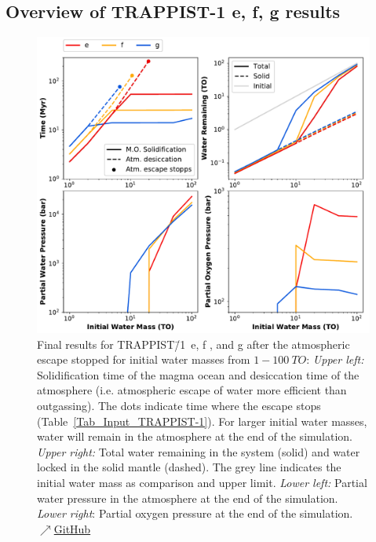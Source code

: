 \documentclass[paper=letterpaper,fontsize=12pt,oneside,twocolumn]{article}
\begin{document}
\subsection{Overview of TRAPPIST-1 e, f, g results}
\begin{figure}[p]
    \centering
    \includegraphics[width=\textwidth]{BarthFig8.pdf}
    \caption{Final results for TRAPPIST\=/1~e, f , and g after the atmospheric escape stopped for initial water masses from $1 - \SI{100}{TO}$: \textit{Upper left:} Solidification time of the magma ocean and desiccation time of the atmosphere (i.e. atmospheric escape of water more efficient than outgassing). The dots indicate time where the escape stops (Table~\ref{Tab_Input_TRAPPIST-1}). For larger initial water masses, water will remain in the atmosphere at the end of the simulation. \textit{Upper right:} Total water remaining in the system (solid) and water locked in the solid mantle (dashed). The grey line indicates the initial water mass as comparison and upper limit. \textit{Lower left:} Partial water pressure in the atmosphere at the end of the simulation. \textit{Lower right}: Partial oxygen pressure at the end of the simulation.
    \href{https://github.com/pbfeu/Trappist1_MagmOc/tree/public/Fig_Trappist1_Summary}{$\nearrow$GitHub}
    }
    \label{TR1_Summary}
\end{figure}
\end{document}
